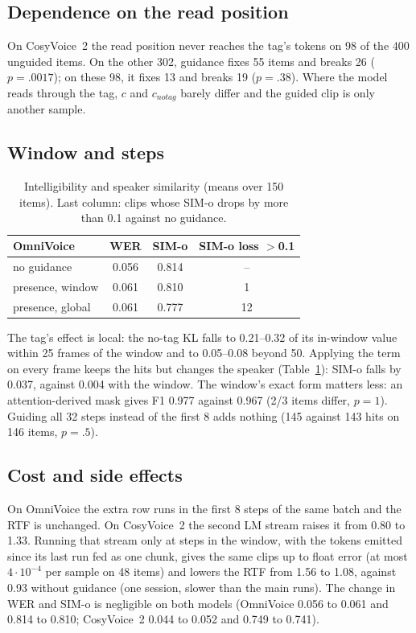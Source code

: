 \documentclass[11pt]{article}
\newcommand{\nt}{\textit{notag}}
\begin{document}
\subsection{Dependence on the read position}
On CosyVoice~2 the read position never reaches the tag's tokens on 98 of the 400 unguided items. On the other 302, guidance fixes 55 items and breaks 26 ($p = .0017$); on these 98, it fixes 13 and breaks 19 ($p = .38$). Where the model reads through the tag, $c$ and $c_{\nt}$ barely differ and the guided clip is only another sample.

\subsection{Window and steps}
\label{sec:window-res}

\begin{table}[t]
  \centering
  \small
  \setlength{\tabcolsep}{4pt}
  \begin{tabular}{lccc}
    \toprule
    OmniVoice & WER & SIM-o & SIM-o loss $>$0.1 \\
    \midrule
    no guidance        & 0.056 & 0.814 & -- \\
    presence, window   & 0.061 & 0.810 & 1 \\
    presence, global   & 0.061 & 0.777 & 12 \\
    \bottomrule
  \end{tabular}
  \caption{Intelligibility and speaker similarity (means over 150 items). Last column: clips whose SIM-o drops by more than 0.1 against no guidance.}
  \label{tab:quality}
\end{table}

The tag's effect is local: the no-tag KL falls to 0.21--0.32 of its in-window value within 25 frames of the window and to 0.05--0.08 beyond 50. Applying the term on every frame keeps the hits but changes the speaker (Table~\ref{tab:quality}): SIM-o falls by 0.037, against 0.004 with the window. The window's exact form matters less: an attention-derived mask \citep{lee2026plcg} gives F1 0.977 against 0.967 (2/3 items differ, $p = 1$). Guiding all 32 steps instead of the first 8 adds nothing (145 against 143 hits on 146 items, $p = .5$).

\subsection{Cost and side effects}
On OmniVoice the extra row runs in the first 8 steps of the same batch and the RTF is unchanged. On CosyVoice~2 the second LM stream raises it from 0.80 to 1.33. Running that stream only at steps in the window, with the tokens emitted since its last run fed as one chunk, gives the same clips up to float error (at most $4\cdot10^{-4}$ per sample on 48 items) and lowers the RTF from 1.56 to 1.08, against 0.93 without guidance (one session, slower than the main runs). The change in WER and SIM-o is negligible on both models (OmniVoice 0.056 to 0.061 and 0.814 to 0.810; CosyVoice~2 0.044 to 0.052 and 0.749 to 0.741).
\end{document}
